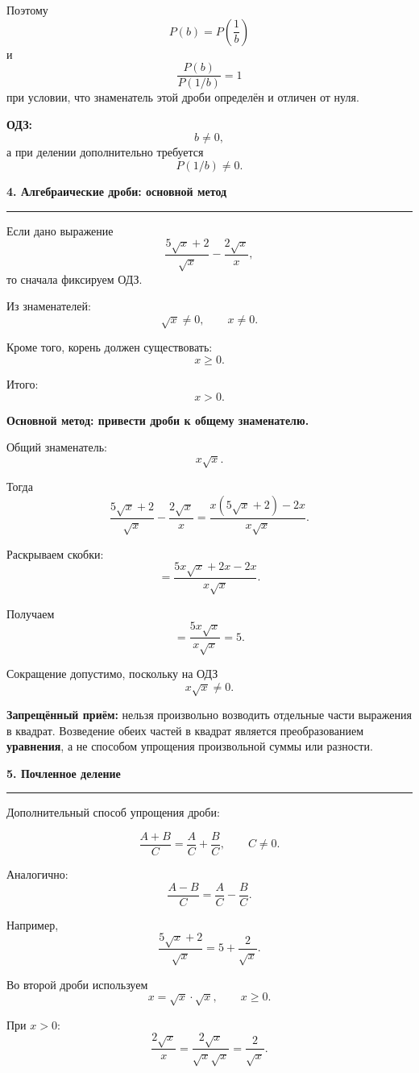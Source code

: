\documentclass[a4paper,12pt]{article}
\newcommand{\lessonsection}[1]{%
    \vspace{0.5em}
    {\Large\bfseries\color{darkaccent}#1}\par
    \vspace{0.2em}
    {\color{accent}\rule{\linewidth}{0.6pt}}
    \vspace{0.5em}
}
\newcommand{\important}[1]{\textbf{\color{darkaccent}#1}}
\begin{document}
Поэтому
\[
P(b)=P\left(\frac1b\right)
\]
и
\[
\frac{P(b)}{P(1/b)}=1
\]
при условии, что знаменатель этой дроби определён и отличен от нуля.

\important{ОДЗ:}
\[
b\ne0,
\]
а при делении дополнительно требуется
\[
P(1/b)\ne0.
\]


\lessonsection{4. Алгебраические дроби: основной метод}

Если дано выражение
\[
\frac{5\sqrt{x}+2}{\sqrt{x}}
-
\frac{2\sqrt{x}}{x},
\]
то сначала фиксируем ОДЗ.

Из знаменателей:
\[
\sqrt{x}\ne0,
\qquad x\ne0.
\]

Кроме того, корень должен существовать:
\[
x\ge0.
\]

Итого:
\[
x>0.
\]

\important{Основной метод: привести дроби к общему знаменателю.}

Общий знаменатель:
\[
x\sqrt{x}.
\]

Тогда
\[
\frac{5\sqrt{x}+2}{\sqrt{x}}
-
\frac{2\sqrt{x}}{x}
=
\frac{x(5\sqrt{x}+2)-2x}{x\sqrt{x}}.
\]

Раскрываем скобки:
\[
=
\frac{5x\sqrt{x}+2x-2x}{x\sqrt{x}}.
\]

Получаем
\[
=
\frac{5x\sqrt{x}}{x\sqrt{x}}
=5.
\]

Сокращение допустимо, поскольку на ОДЗ
\[
x\sqrt{x}\ne0.
\]

\important{Запрещённый приём:} нельзя произвольно возводить отдельные части выражения в квадрат. Возведение обеих частей в квадрат является преобразованием \textbf{уравнения}, а не способом упрощения произвольной суммы или разности.


\lessonsection{5. Почленное деление}

Дополнительный способ упрощения дроби:

\[
\frac{A+B}{C}
=
\frac AC+\frac BC,
\qquad C\ne0.
\]

Аналогично:
\[
\frac{A-B}{C}
=
\frac AC-\frac BC.
\]

Например,
\[
\frac{5\sqrt{x}+2}{\sqrt{x}}
=
5+\frac{2}{\sqrt{x}}.
\]

Во второй дроби используем
\[
x=\sqrt{x}\cdot\sqrt{x},
\qquad x\ge0.
\]

При \(x>0\):
\[
\frac{2\sqrt{x}}{x}
=
\frac{2\sqrt{x}}
{\sqrt{x}\sqrt{x}}
=
\frac2{\sqrt{x}}.
\]
\end{document}
